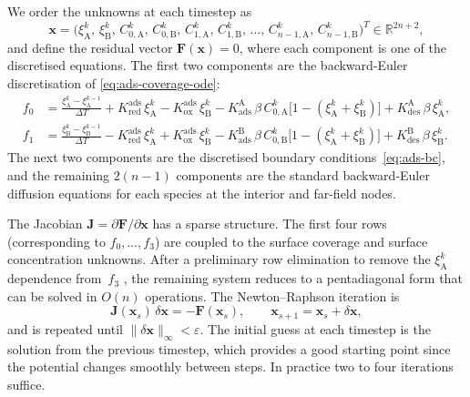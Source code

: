 We order the unknowns at each timestep as
\begin{equation}\label{eq:ads-ordering}
  \mathbf{x} = \bigl(
    \xi_\mathrm{A}^k,\, \xi_\mathrm{B}^k,\,
    C_{0,\mathrm{A}}^k,\, C_{0,\mathrm{B}}^k,\,
    C_{1,\mathrm{A}}^k,\, C_{1,\mathrm{B}}^k,\,
    \ldots,\,
    C_{n-1,\mathrm{A}}^k,\, C_{n-1,\mathrm{B}}^k
  \bigr)^T \in \mathbb{R}^{2n+2},
\end{equation}
and define the residual vector $\mathbf{F}(\mathbf{x}) = 0$, where each
component is one of the discretised equations. The first two components
are the backward-Euler discretisation of
\cref{eq:ads-coverage-ode}:
\begin{equation}\label{eq:ads-disc-coverage}
  \begin{aligned}
    f_0 &=
    \frac{\xi_\mathrm{A}^k - \xi_\mathrm{A}^{k-1}}{\Delta T}
    + K_{\mathrm{red}}^{\mathrm{ads}}\,\xi_\mathrm{A}^k
    - K_{\mathrm{ox}}^{\mathrm{ads}}\,\xi_\mathrm{B}^k
    - K_{\mathrm{ads}}^{\mathrm{A}}\,\beta\,C_{0,\mathrm{A}}^k
    \bigl[1 - (\xi_\mathrm{A}^k + \xi_\mathrm{B}^k)\bigr]
    + K_{\mathrm{des}}^{\mathrm{A}}\,\beta\,\xi_\mathrm{A}^k, \\[4pt]
    f_1 &=
    \frac{\xi_\mathrm{B}^k - \xi_\mathrm{B}^{k-1}}{\Delta T}
    - K_{\mathrm{red}}^{\mathrm{ads}}\,\xi_\mathrm{A}^k
    + K_{\mathrm{ox}}^{\mathrm{ads}}\,\xi_\mathrm{B}^k
    - K_{\mathrm{ads}}^{\mathrm{B}}\,\beta\,C_{0,\mathrm{B}}^k
    \bigl[1 - (\xi_\mathrm{A}^k + \xi_\mathrm{B}^k)\bigr]
    + K_{\mathrm{des}}^{\mathrm{B}}\,\beta\,\xi_\mathrm{B}^k.
  \end{aligned}
\end{equation}
The next two components are the discretised boundary
conditions~\cref{eq:ads-bc}, and the remaining $2(n-1)$ components are
the standard backward-Euler diffusion equations for each species at the
interior and far-field nodes.

The Jacobian $\mathbf{J} = \partial\mathbf{F}/\partial\mathbf{x}$
has a sparse structure. The first four rows (corresponding to
$f_0,\ldots,f_3$) are coupled to the surface coverage and surface
concentration unknowns. After a preliminary row elimination to remove
the $\xi_\mathrm{A}^k$ dependence from~$f_3$
\cite{compton2014understanding}, the remaining system reduces to a
pentadiagonal form that can be solved in $O(n)$ operations. The
Newton--Raphson iteration is
\begin{equation}\label{eq:ads-newton}
  \mathbf{J}(\mathbf{x}_s)\,\delta\mathbf{x}
  = -\mathbf{F}(\mathbf{x}_s),
  \qquad
  \mathbf{x}_{s+1} = \mathbf{x}_s + \delta\mathbf{x},
\end{equation}
and is repeated until $\|\delta\mathbf{x}\|_\infty < \varepsilon$. The
initial guess at each timestep is the solution from the previous
timestep, which provides a good starting point since the potential
changes smoothly between steps. In practice two to four iterations
suffice.

